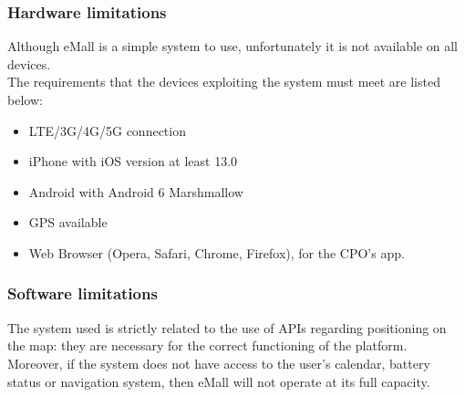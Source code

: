 \subsubsection{Hardware limitations}
Although eMall is a simple system to use, unfortunately it is not available on all devices. \\
The requirements that the devices exploiting the system must meet are listed below:
\begin{itemize}
    \item LTE/3G/4G/5G connection
    \item iPhone with iOS version at least 13.0
    \item Android with Android 6 Marshmallow
    \item GPS available
    \item Web Browser (Opera, Safari, Chrome, Firefox), for the CPO's app.
\end{itemize}
\subsubsection{Software limitations}
The system used is strictly related to the use of APIs regarding positioning on the map: they are necessary for the correct functioning of the platform. \\
Moreover, if the system does not have access to the user's calendar, battery status or navigation system, then eMall will not operate at its full capacity.